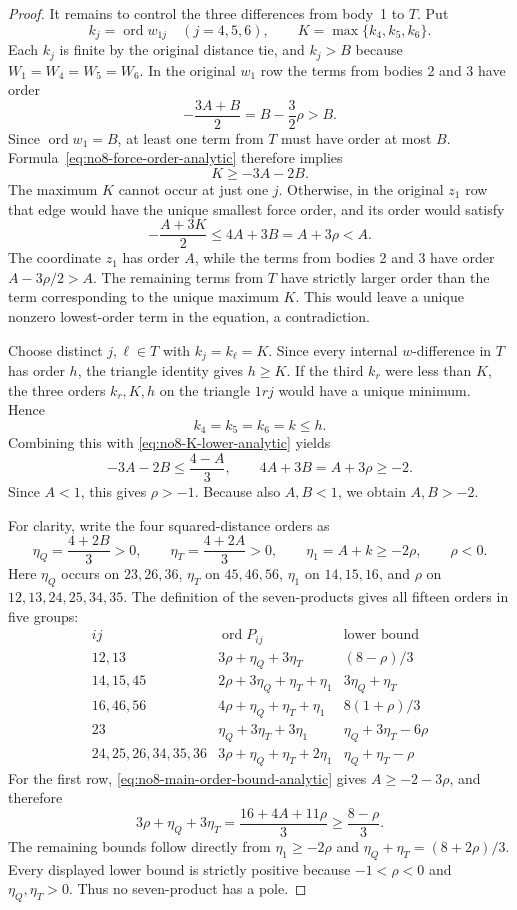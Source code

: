 \documentclass[11pt]{amsart}
\theoremstyle{remark}
\newcommand{\ord}{\operatorname{ord}}
\begin{document}
\begin{proof}
It remains to control the three differences from body~1 to $T$. Put
\[
k_j=\ord w_{1j}\quad(j=4,5,6),\qquad K=\max\{k_4,k_5,k_6\}.
\]
Each $k_j$ is finite by the original distance tie, and $k_j>B$ because $W_1=W_4=W_5=W_6$. In the original $w_1$ row the terms from bodies 2 and 3 have order
\[
-\frac{3A+B}{2}=B-\frac32\rho>B.
\]
Since $\ord w_1=B$, at least one term from $T$ must have order at most $B$. Formula~\eqref{eq:no8-force-order-analytic} therefore implies
\begin{equation}\label{eq:no8-K-lower-analytic}
K\ge-3A-2B.
\end{equation}
The maximum $K$ cannot occur at just one $j$. Otherwise, in the original $z_1$ row that edge would have the unique smallest force order, and its order would satisfy
\[
-\frac{A+3K}{2}\le4A+3B=A+3\rho<A.
\]
The coordinate $z_1$ has order $A$, while the terms from bodies 2 and 3 have order $A-3\rho/2>A$. The remaining terms from $T$ have strictly larger order than the term corresponding to the unique maximum $K$. This would leave a unique nonzero lowest-order term in the equation, a contradiction.

Choose distinct $j,\ell\in T$ with $k_j=k_\ell=K$. Since every internal $w$-difference in $T$ has order $h$, the triangle identity gives $h\ge K$. If the third $k_r$ were less than $K$, the three orders $k_r,K,h$ on the triangle $1rj$ would have a unique minimum. Hence
\[
k_4=k_5=k_6=k\le h.
\]
Combining this with \eqref{eq:no8-K-lower-analytic} yields
\begin{equation}\label{eq:no8-main-order-bound-analytic}
-3A-2B\le\frac{4-A}{3},\qquad
4A+3B=A+3\rho\ge-2.
\end{equation}
Since $A<1$, this gives $\rho>-1$. Because also $A,B<1$, we obtain $A,B>-2$.

For clarity, write the four squared-distance orders as
\[
\eta_Q=\frac{4+2B}{3}>0,\qquad
\eta_T=\frac{4+2A}{3}>0,\qquad
\eta_1=A+k\ge-2\rho,
\qquad \rho<0.
\]
Here $\eta_Q$ occurs on $23,26,36$, $\eta_T$ on $45,46,56$, $\eta_1$ on $14,15,16$, and $\rho$ on $12,13,24,25,34,35$. The definition of the seven-products gives all fifteen orders in five groups:
\[
\begin{array}{c|c|c}
 ij&\ord P_{ij}&\text{lower bound}\\\hline
12,13&3\rho+\eta_Q+3\eta_T&(8-\rho)/3\\
14,15,45&2\rho+3\eta_Q+\eta_T+\eta_1&3\eta_Q+\eta_T\\
16,46,56&4\rho+\eta_Q+\eta_T+\eta_1&8(1+\rho)/3\\
23&\eta_Q+3\eta_T+3\eta_1&\eta_Q+3\eta_T-6\rho\\
24,25,26,34,35,36&3\rho+\eta_Q+\eta_T+2\eta_1&\eta_Q+\eta_T-\rho
\end{array}
\]
For the first row, \eqref{eq:no8-main-order-bound-analytic} gives $A\ge-2-3\rho$, and therefore
\[
3\rho+\eta_Q+3\eta_T
=\frac{16+4A+11\rho}{3}\ge\frac{8-\rho}{3}.
\]
The remaining bounds follow directly from $\eta_1\ge-2\rho$ and $\eta_Q+\eta_T=(8+2\rho)/3$. Every displayed lower bound is strictly positive because $-1<\rho<0$ and $\eta_Q,\eta_T>0$. Thus no seven-product has a pole.


\end{proof}
\end{document}
